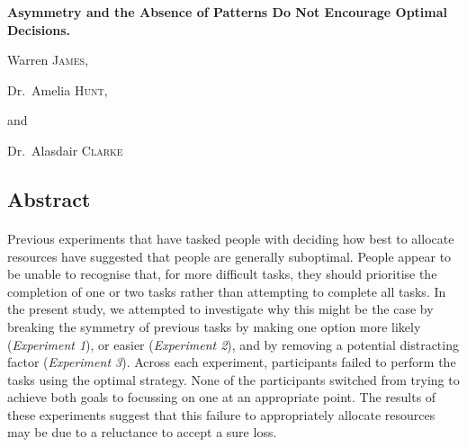 \documentclass[12pt]{article}
\begin{document}
\begin{titlepage}
	\centering
	{\huge\bfseries Asymmetry and the Absence of Patterns Do Not Encourage Optimal Decisions.\par}
	\vspace{1cm}
	Warren \textsc{James}, \par
	Dr.~Amelia \textsc{Hunt},\par
	and\par
	Dr.~Alasdair \textsc{Clarke}
	\vfill
\end{titlepage}	


\newpage
\begin{center}
\section*{Abstract}
\paragraph{} Previous experiments that have tasked people with deciding how best to allocate resources have suggested that people are generally suboptimal. People appear to be unable to recognise that, for more difficult tasks, they should prioritise the completion of one or two tasks rather than attempting to complete all tasks. In the present study, we attempted to investigate why this might be the case by breaking the symmetry of previous tasks by making one option more likely (\textit{Experiment 1}), or easier (\textit{Experiment 2}), and by removing a potential distracting factor (\textit{Experiment 3}). Across each experiment, participants failed to perform the tasks using the optimal strategy. None of the participants switched from trying to achieve both goals to focussing on one at an appropriate point. The results of these experiments suggest that this failure to appropriately allocate resources may be due to a reluctance to accept a sure loss. 
\end{center}

\end{document}

